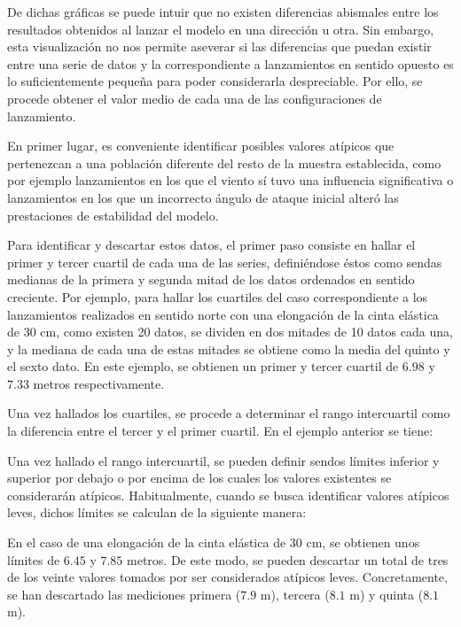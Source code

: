De dichas gráficas se puede intuir que no existen diferencias abismales entre los resultados obtenidos al lanzar el modelo en una dirección u otra. Sin embargo, esta visualización no nos permite aseverar si las diferencias que puedan existir entre una serie de datos y la correspondiente a lanzamientos en sentido opuesto es lo suficientemente pequeña para poder considerarla despreciable. Por ello, se procede obtener el valor medio de cada una de las configuraciones de lanzamiento.

En primer lugar, es conveniente identificar posibles valores atípicos que pertenezcan a una población diferente del resto de la muestra establecida, como por ejemplo lanzamientos en los que el viento sí tuvo una influencia significativa o lanzamientos en los que un incorrecto ángulo de ataque inicial alteró las prestaciones de estabilidad del modelo.

Para identificar y descartar estos datos, el primer paso consiste en hallar el primer y tercer cuartil de cada una de las series, definiéndose éstos como sendas medianas de la primera y segunda mitad de los datos ordenados en sentido creciente. Por ejemplo, para hallar los cuartiles del caso correspondiente a los lanzamientos realizados en sentido norte con una elongación de la cinta elástica de 30 cm, como existen 20 datos, se dividen en dos mitades de 10 datos cada una, y la mediana de cada una de estas mitades se obtiene como la media del quinto y el sexto dato. En este ejemplo, se obtienen un primer y tercer cuartil de $6.98$ y $7.33$ metros respectivamente.

Una vez hallados los cuartiles, se procede a determinar el rango intercuartil como la diferencia entre el tercer y el primer cuartil. En el ejemplo anterior se tiene:

Una vez hallado el rango intercuartil, se pueden definir sendos límites inferior y superior por debajo o por encima de los cuales los valores existentes se considerarán atípicos. Habitualmente, cuando se busca identificar valores atípicos leves, dichos límites se calculan de la siguiente manera:

En el caso de una elongación de la cinta elástica de 30 cm, se obtienen unos límites de $6.45$ y $7.85$ metros. De este modo, se pueden descartar un total de tres de los veinte valores tomados por ser considerados atípicos leves. Concretamente, se han descartado las mediciones primera ($7.9$ m), tercera ($8.1$ m) y quinta ($8.1$ m).

